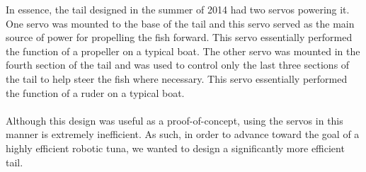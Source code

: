 \noindent In essence, the tail designed in the summer of 2014 had two servos powering it. One servo was mounted to the base of the tail and this servo served as the main source of power for propelling the fish forward. This servo essentially performed the function of a propeller on a typical boat. The other servo was mounted in the fourth section of the tail and was used to control only the last three sections of the tail to help steer the fish where necessary. This servo essentially performed the function of a ruder on a typical boat. \\ \\
%
Although this design was useful as a proof-of-concept, using the servos in this manner is extremely inefficient. As such, in order to advance toward the goal of a highly efficient robotic tuna, we wanted to design a significantly more efficient tail.